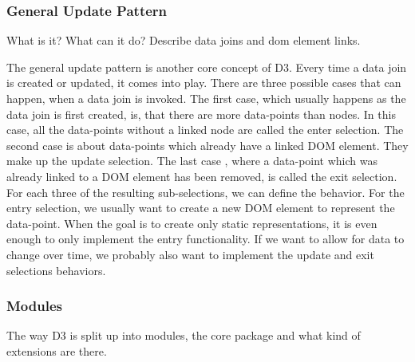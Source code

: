 \subsubsection{General Update Pattern}
What is it? What can it do? Describe data joins and dom element links.

The general update pattern is another core concept of D3. Every time a data join is created or updated, it comes into play. There are three possible cases that can happen, when a data join is invoked. The first case, which usually happens as the data join is first created, is, that there are more data-points than nodes. In this case, all the data-points without a linked node are called the enter selection. The second case is about data-points which already have a linked DOM element. They make up the update selection. The last case , where a data-point which was already linked to a DOM element has been removed, is called the exit selection. For each three of the resulting sub-selections, we can define the behavior. For the entry selection, we usually want to create a new DOM element to represent the data-point. When the goal is to create only static representations, it is even enough to only implement the entry functionality. If we want to allow for data to change over time, we probably also want to implement the update and exit selections behaviors.


\subsubsection{Modules}
The way D3 is split up into modules, the core package and what kind of extensions are there.
